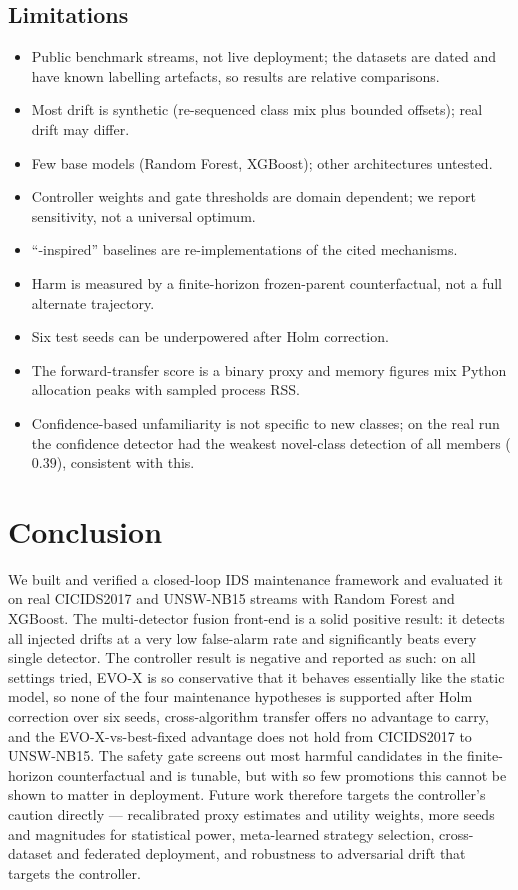 \documentclass[conference]{IEEEtran}
\newcommand{\evox}{\textsc{EVO-X}}
\begin{document}
\subsection{Limitations}
\begin{itemize}
  \item Public benchmark streams, not live deployment; the datasets are dated and have known labelling artefacts, so results are relative comparisons.
  \item Most drift is synthetic (re-sequenced class mix plus bounded offsets); real drift may differ.
  \item Few base models (Random Forest, XGBoost); other architectures untested.
  \item Controller weights and gate thresholds are domain dependent; we report sensitivity, not a universal optimum.
  \item ``-inspired'' baselines are re-implementations of the cited mechanisms.
  \item Harm is measured by a finite-horizon frozen-parent counterfactual, not a full alternate trajectory.
  \item Six test seeds can be underpowered after Holm correction.
  \item The forward-transfer score is a binary proxy and memory figures mix Python allocation peaks with sampled process RSS.
  \item Confidence-based unfamiliarity is not specific to new classes; on the real run the confidence detector had the weakest novel-class detection of all members ($0.39$), consistent with this.
\end{itemize}

\section{Conclusion}
We built and verified a closed-loop IDS maintenance framework and evaluated it on real CICIDS2017 and UNSW-NB15 streams with Random Forest and XGBoost. The multi-detector fusion front-end is a solid positive result: it detects all injected drifts at a very low false-alarm rate and significantly beats every single detector. The controller result is negative and reported as such: on all settings tried, \evox{} is so conservative that it behaves essentially like the static model, so none of the four maintenance hypotheses is supported after Holm correction over six seeds, cross-algorithm transfer offers no advantage to carry, and the \evox{}-vs-best-fixed advantage does not hold from CICIDS2017 to UNSW-NB15. The safety gate screens out most harmful candidates in the finite-horizon counterfactual and is tunable, but with so few promotions this cannot be shown to matter in deployment. Future work therefore targets the controller's caution directly --- recalibrated proxy estimates and utility weights, more seeds and magnitudes for statistical power, meta-learned strategy selection, cross-dataset and federated deployment, and robustness to adversarial drift that targets the controller.
\end{document}

